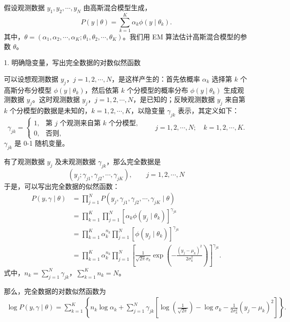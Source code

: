 \documentclass[UTF8,12pt,a4paper,fontset=fandol]{ctexart}
\begin{document}
假设观测数据 $y_1,y_2,\cdots,y_N$ 由高斯混合模型生成，
\begin{equation}
  P(y\mid\theta)=\sum_{k=1}^K \alpha_k\phi(y\mid\theta_k).
  \tag{9.26}
\end{equation}
其中，$\theta=(\alpha_1,\alpha_2,\cdots,\alpha_K;\theta_1,\theta_2,\cdots,\theta_K)$。我们用 EM 算法估计高斯混合模型的参数 $\theta$。

1. 明确隐变量，写出完全数据的对数似然函数

可以设想观测数据 $y_j$，$j=1,2,\cdots,N$，是这样产生的：首先依概率 $\alpha_k$ 选择第 $k$ 个高斯分布分模型 $\phi(y\mid\theta_k)$，然后依第 $k$ 个分模型的概率分布 $\phi(y\mid\theta_k)$ 生成观测数据 $y_j$。这时观测数据 $y_j$，$j=1,2,\cdots,N$，是已知的；反映观测数据 $y_j$ 来自第 $k$ 个分模型的数据是未知的，$k=1,2,\cdots,K$，以隐变量 $\gamma_{jk}$ 表示，其定义如下：
\begin{equation}
  \gamma_{jk}=
  \begin{cases}
    1, & \text{第 $j$ 个观测来自第 $k$ 个分模型},\\
    0, & \text{否则},
  \end{cases}
  \qquad
  j=1,2,\cdots,N;\quad k=1,2,\cdots,K.
  \tag{9.27}
\end{equation}
$\gamma_{jk}$ 是 0-1 随机变量。

有了观测数据 $y_j$ 及未观测数据 $\gamma_{jk}$，那么完全数据是
\[
  (y_j;\gamma_{j1},\gamma_{j2},\cdots,\gamma_{jK}),\qquad j=1,2,\cdots,N
\]
于是，可以写出完全数据的似然函数：
\[
\begin{aligned}
  P(y,\gamma\mid\theta)
  &=\prod_{j=1}^N P(y_j,\gamma_{j1},\gamma_{j2},\cdots,\gamma_{jK}\mid\theta)\\
  &=\prod_{k=1}^K\prod_{j=1}^N
  [\alpha_k\phi(y_j\mid\theta_k)]^{\gamma_{jk}}\\
  &=\prod_{k=1}^K\alpha_k^{n_k}\prod_{j=1}^N
  [\phi(y_j\mid\theta_k)]^{\gamma_{jk}}\\
  &=\prod_{k=1}^K\alpha_k^{n_k}\prod_{j=1}^N
  \left[\frac1{\sqrt{2\pi}\sigma_k}
  \exp\left(-\frac{(y_j-\mu_k)^2}{2\sigma_k^2}\right)\right]^{\gamma_{jk}}.
\end{aligned}
\]
式中，$n_k=\sum_{j=1}^N\gamma_{jk}$，$\sum_{k=1}^K n_k=N$。

那么，完全数据的对数似然函数为
\[
\begin{aligned}
  \log P(y,\gamma\mid\theta)
  =\sum_{k=1}^K\left\{
  n_k\log\alpha_k+\sum_{j=1}^N\gamma_{jk}
  \left[\log\left(\frac1{\sqrt{2\pi}}\right)-\log\sigma_k
  -\frac1{2\sigma_k^2}(y_j-\mu_k)^2\right]\right\}.
\end{aligned}
\]
\end{document}
